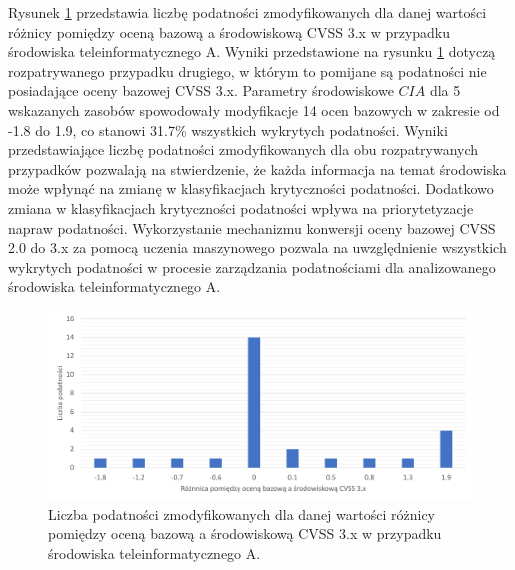 \bigbreak
Rysunek \ref{fig:chapter6:env_a:cvss_3_changes} przedstawia liczbę podatności zmodyfikowanych dla danej wartości różnicy pomiędzy oceną bazową a środowiskową CVSS 3.x w przypadku środowiska teleinformatycznego A. Wyniki przedstawione na rysunku \ref{fig:chapter6:env_a:cvss_3_changes} dotyczą rozpatrywanego przypadku drugiego, w którym to pomijane są podatności nie posiadające oceny bazowej CVSS 3.x. Parametry środowiskowe $CIA$ dla 5 wskazanych zasobów spowodowały modyfikacje 14 ocen bazowych w zakresie od -1.8 do 1.9, co stanowi 31.7\% wszystkich wykrytych podatności. Wyniki przedstawiające liczbę podatności zmodyfikowanych dla obu rozpatrywanych przypadków pozwalają na stwierdzenie, że każda informacja na temat środowiska może wpłynąć na zmianę w klasyfikacjach krytyczności podatności. Dodatkowo zmiana w klasyfikacjach krytyczności podatności wpływa na priorytetyzacje napraw podatności. Wykorzystanie mechanizmu konwersji oceny bazowej CVSS 2.0 do 3.x za pomocą uczenia maszynowego pozwala na uwzględnienie wszystkich wykrytych podatności w procesie zarządzania podatnościami dla analizowanego środowiska teleinformatycznego A.

\begin{figure}[!ht]
\centering
\includegraphics[width=.9\textwidth]{Chapters/Eksperymenty/env_A_results/changes_cvss_3.pdf}
\caption{Liczba podatności zmodyfikowanych dla danej wartości różnicy pomiędzy oceną bazową a środowiskową CVSS 3.x w przypadku środowiska teleinformatycznego A.}
\label{fig:chapter6:env_a:cvss_3_changes}
\end{figure}

